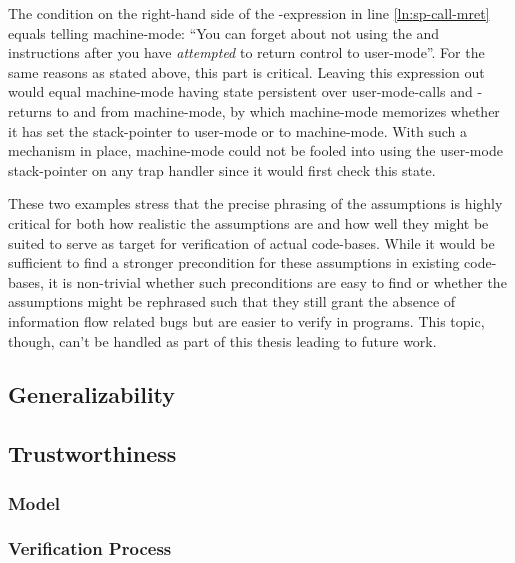 The condition  on the right-hand side of the -expression in line \ref{ln:sp-call-mret} equals telling machine-mode: \enquote{You can forget about not using the  and  instructions after you have \textit{attempted} to return control to user-mode}.
For the same reasons as stated above, this part is critical.
Leaving this expression out would equal machine-mode having state persistent over user-mode-calls and -returns to and from machine-mode, by which machine-mode memorizes whether it has set the stack-pointer to user-mode or to machine-mode.
With such a mechanism in place, machine-mode could not be fooled into using the user-mode stack-pointer on any trap handler since it would first check this state.

These two examples stress that the precise phrasing of the assumptions is highly critical for both how realistic the assumptions are and how well they might be suited to serve as target for verification of actual code-bases.
While it would be sufficient to find a stronger precondition for these assumptions in existing code-bases, it is non-trivial whether such preconditions are easy to find or whether the assumptions might be rephrased such that they still grant the absence of information flow related bugs but are easier to verify in programs.
This topic, though, can't be handled as part of this thesis leading to future work.

\subsection{Generalizability}

\subsection{Trustworthiness}

\subsubsection{Model}

\subsubsection{Verification Process}
